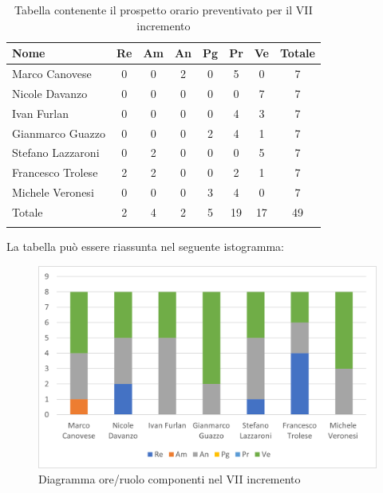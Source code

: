 \begin{longtable}{|l|c|c|c|c|c|c|c|}
	\hline
	\rowcolor{lighter-grayer}
	\textbf{Nome}     & \textbf{Re} & \textbf{Am} & \textbf{An} & \textbf{Pg} & \textbf{Pr} & \textbf{Ve} & \textbf{Totale} \\
	\hline
	\endfirsthead

	\hline
	Marco Canovese    & 0           & 0           & 2           & 0           & 5           & 0           & 7               \\
	\hline
	\hline
	Nicole Davanzo    & 0           & 0           & 0           & 0           & 0           & 7           & 7               \\
	\hline
	\hline
	Ivan Furlan       & 0           & 0           & 0           & 0           & 4           & 3           & 7               \\
	\hline
	\hline
	Gianmarco Guazzo  & 0           & 0           & 0           & 2           & 4           & 1           & 7               \\
	\hline
	\hline
	Stefano Lazzaroni & 0           & 2           & 0           & 0           & 0           & 5           & 7               \\
	\hline
	\hline
	Francesco Trolese & 2           & 2           & 0           & 0           & 2           & 1           & 7               \\
	\hline
	\hline
	Michele Veronesi  & 0           & 0           & 0           & 3           & 4           & 0           & 7               \\
	\hline
	\hline
	Totale            & 2           & 4           & 2          & 5           & 19           & 17          & 49              \\
	\hline
	\rowcolor{white}
	\caption{Tabella contenente il prospetto orario preventivato per il VII incremento}
\end{longtable}


La tabella può essere riassunta nel seguente istogramma:

\begin{figure}[H]
	\centering
	\includegraphics[width=0.8\linewidth]{res/images/preventivo/dettaglio_analisi/4-1.png}
	\caption{Diagramma ore/ruolo componenti nel VII incremento}
	\label{fig:diagramma suddivisione ruoli VII incremento}
\end{figure}

